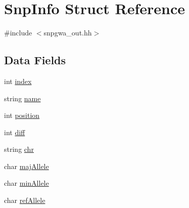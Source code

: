 \hypertarget{structSnpInfo}{
\section{SnpInfo Struct Reference}
\label{structSnpInfo}
}


{\ttfamily \#include $<$snpgwa\_\-out.hh$>$}

\subsection*{Data Fields}
\begin{DoxyCompactItemize}
\item 
int \hyperlink{structSnpInfo_a9e340750436d460a79d14a3cca98d4c2}{index}
\item 
string \hyperlink{structSnpInfo_ad7d911ac92fd6e76e7140dc02f8646b7}{name}
\item 
int \hyperlink{structSnpInfo_a591c2bc650f6108b2e6ce0088ca1c8ca}{position}
\item 
int \hyperlink{structSnpInfo_a8703dc63736fd564b6d0f2f7c133fb51}{diff}
\item 
string \hyperlink{structSnpInfo_a4c1b299243468cc51b85faae1ba3fab9}{chr}
\item 
char \hyperlink{structSnpInfo_a81ef1a04ce03dbcbd357081f2f9da5bc}{majAllele}
\item 
char \hyperlink{structSnpInfo_a9dbfcbe8817b01358436533774b1d36b}{minAllele}
\item 
char \hyperlink{structSnpInfo_a7bb6397cd3bbc9461b0b2bf5390bf2b1}{refAllele}
\end{DoxyCompactItemize}


